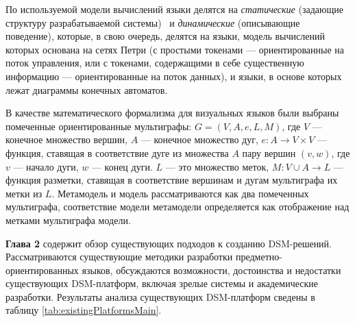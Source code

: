 По используемой модели вычислений языки делятся на \textit{статические} (задающие структуру разрабатываемой системы) \
и \textit{динамические} (описывающие поведение), которые, в свою очередь, делятся на языки, 
модель вычислений которых основана на сетях Петри (с простыми токенами --- ориентированные на поток управления,
или с токенами, содержащими в себе существенную информацию --- ориентированные на поток данных),
и языки, в основе которых лежат диаграммы конечных автоматов.

В качестве математического формализма для визуальных языков были выбраны помеченные
ориентированные мультиграфы: $G = (V, A, e, L, M)$, где $V$ --- конечное множество вершин,
$A$ --- конечное множество дуг, $e: A \rightarrow V \times V$ --- функция, ставящая в соответствие
дуге из множества $A$ пару вершин $(v, w)$, где $v$ --- начало дуги, $w$ --- конец дуги.
$L$ --- это множество меток, $M: V \cup A \rightarrow L$ --- функция разметки, ставящая
в соответствие вершинам и дугам мультиграфа их метки из $L$. Метамодель и модель рассматриваются
как два помеченных мультиграфа, соответствие модели метамодели определяется как отображение
над метками мультиграфа модели.

\textbf{Глава 2} содержит обзор существующих подходов к созданию DSM-решений. 
Рассматриваются существующие методики разработки предметно-ориентированных языков,
обсуждаются возможности, достоинства и недостатки существующих DSM-платформ, 
включая зрелые системы и академические разработки. Результаты анализа существующих 
DSM-платформ сведены в таблицу \ref{tab:existingPlatformsMain}.

